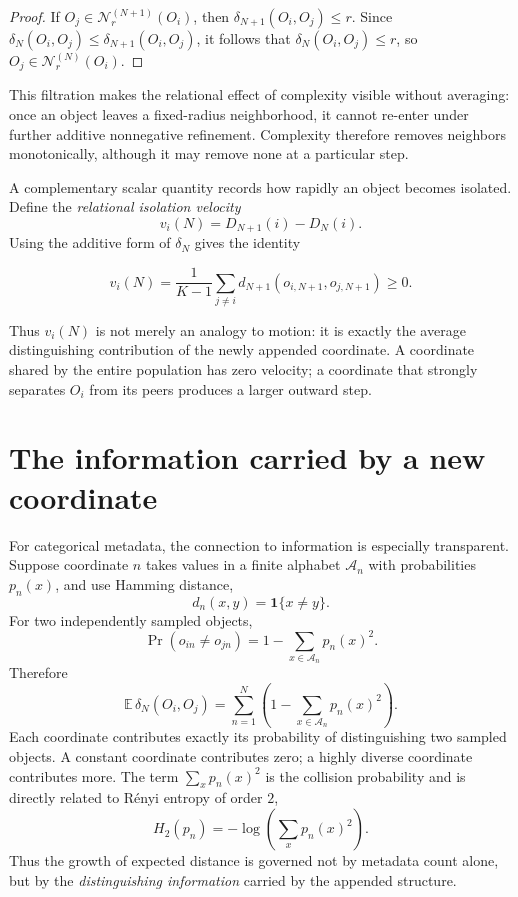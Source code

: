 \documentclass[10pt]{article}
\newlength{\extradisplayshortskip}
\begin{document}
\begin{proof}
If $O_j\in\mathcal N_r^{(N+1)}(O_i)$, then $\delta_{N+1}(O_i,O_j)\le r$. Since $\delta_N(O_i,O_j)\le\delta_{N+1}(O_i,O_j)$, it follows that $\delta_N(O_i,O_j)\le r$, so $O_j\in\mathcal N_r^{(N)}(O_i)$.
\end{proof}

This filtration makes the relational effect of complexity visible without averaging: once an object leaves a fixed-radius neighborhood, it cannot re-enter under further additive nonnegative refinement. Complexity therefore removes neighbors monotonically, although it may remove none at a particular step.

A complementary scalar quantity records how rapidly an object becomes isolated. Define the \emph{relational isolation velocity}
\[
v_i(N)=D_{N+1}(i)-D_N(i).
\]
Using the additive form of $\delta_N$ gives the identity
\begin{highlightbox}
\[
v_i(N)=\frac{1}{K-1}\sum_{j\ne i}
d_{N+1}(o_{i,N+1},o_{j,N+1})\ge 0.
\]
\end{highlightbox}
Thus $v_i(N)$ is not merely an analogy to motion: it is exactly the average distinguishing contribution of the newly appended coordinate. A coordinate shared by the entire population has zero velocity; a coordinate that strongly separates $O_i$ from its peers produces a larger outward step.

\setlength{\extradisplayshortskip}{1.3pt}
\section*{The information carried by a new coordinate}
For categorical metadata, the connection to information is especially transparent. Suppose coordinate $n$ takes values in a finite alphabet $\mathcal A_n$ with probabilities $p_n(x)$, and use Hamming distance,
\[
d_n(x,y)=\mathbf 1\{x\ne y\}.
\]
For two independently sampled objects,
\[
\Pr(o_{in}\ne o_{jn})
=1-\sum_{x\in\mathcal A_n}p_n(x)^2.
\]
Therefore
\[
\mathbb E\,\delta_N(O_i,O_j)
=\sum_{n=1}^{N}\left(1-\sum_{x\in\mathcal A_n}p_n(x)^2\right).
\]
\newpage
Each coordinate contributes exactly its probability of distinguishing two sampled objects. A constant coordinate contributes zero; a highly diverse coordinate contributes more. The term $\sum_x p_n(x)^2$ is the collision probability and is directly related to R\'enyi entropy of order $2$,
\[
H_2(p_n)=-\log\!\left(\sum_x p_n(x)^2\right).
\]
Thus the growth of expected distance is governed not by metadata count alone, but by the \emph{distinguishing information} carried by the appended structure.
\end{document}
